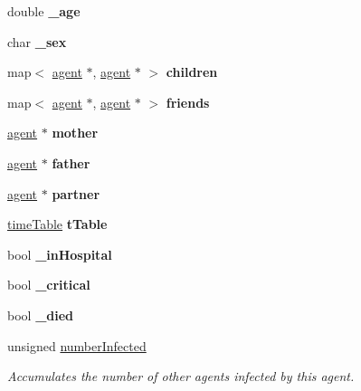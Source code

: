 \begin{DoxyCompactItemize}
double {\bfseries \+\_\+age}
\item 
\mbox{\label{classagent_ad2e0f7c2a20dcfa12f07a07520ee7e4a}} 
char {\bfseries \+\_\+sex}
\item 
\mbox{\label{classagent_a2f484df3bd597a8974b892415f7a81da}} 
map$<$ \mbox{\hyperlink{classagent}{agent}} $\ast$, \mbox{\hyperlink{classagent}{agent}} $\ast$ $>$ {\bfseries children}
\item 
\mbox{\label{classagent_a591d6d0b76938f2d8ce45b81ddc9198e}} 
map$<$ \mbox{\hyperlink{classagent}{agent}} $\ast$, \mbox{\hyperlink{classagent}{agent}} $\ast$ $>$ {\bfseries friends}
\item 
\mbox{\label{classagent_a34b299f3d80898282060620413ca4c39}} 
\mbox{\hyperlink{classagent}{agent}} $\ast$ {\bfseries mother}
\item 
\mbox{\label{classagent_a40954e3f65115355c91f935a01341a56}} 
\mbox{\hyperlink{classagent}{agent}} $\ast$ {\bfseries father}
\item 
\mbox{\label{classagent_ae684b71a09da86798ffb134c0ff1e0ba}} 
\mbox{\hyperlink{classagent}{agent}} $\ast$ {\bfseries partner}
\item 
\mbox{\label{classagent_a0a669d47bb2f6781ea5ec1f2cdfdd4e2}} 
\mbox{\hyperlink{structtimeTable}{time\+Table}} {\bfseries t\+Table}
\item 
\mbox{\label{classagent_a4a2f231b103bbe13452570921e296ea1}} 
bool {\bfseries \+\_\+in\+Hospital}
\item 
\mbox{\label{classagent_a9803ed96415b37e5ad091848a53e1944}} 
bool {\bfseries \+\_\+critical}
\item 
\mbox{\label{classagent_a0d09f2c676410b866a348291900ee520}} 
bool {\bfseries \+\_\+died}
\item 
unsigned \mbox{\hyperlink{classagent_a4145c90d534f84deb22a93560809134c}{number\+Infected}}
\begin{DoxyCompactList}\small\item\em Accumulates the number of other agents infected by this agent. \end{DoxyCompactList}\item 

\end{DoxyCompactItemize}
